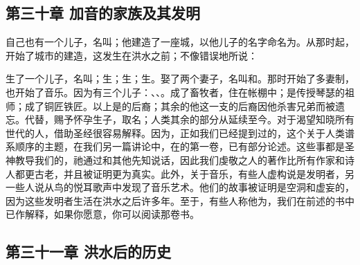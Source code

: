 
\subsection{第三十章 加音的家族及其发明}

自己也有一个儿子，名叫；他建造了一座城，以他儿子的名字命名为。从那时起，开始了城市的建造，这发生在洪水之前；不像错误地所说：\par

\par

生了一个儿子，名叫；生；生；生。娶了两个妻子，名叫和。那时开始了多妻制，也开始了音乐。因为有三个儿子：、、。成了畜牧者，住在帐棚中；是传授琴瑟的祖师；成了铜匠铁匠。以上是的后裔；其余的他这一支的后裔因他杀害兄弟而被遗忘。代替，赐予怀孕生子，取名；人类其余的部分从延续至今。对于渴望知晓所有世代的人，借助圣经很容易解释。因为，正如我们已经提到过的，这个关于人类谱系顺序的主题，在我们另一篇讲论中，在的第一卷，已有部分论述。这些事都是圣神教导我们的，祂通过和其他先知说话，因此我们虔敬之人的著作比所有作家和诗人都更古老，并且被证明更为真实。此外，关于音乐，有些人虚构说是发明者，另一些人说从鸟的悦耳歌声中发现了音乐艺术。他们的故事被证明是空洞和虚妄的，因为这些发明者生活在洪水之后许多年。至于，有些人称他为，我们在前述的书中已作解释，如果你愿意，你可以阅读那卷书。\par


\subsection{第三十一章 洪水后的历史}

